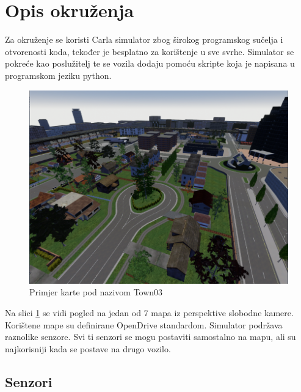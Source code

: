 \section{Opis okruženja}

Za okruženje se koristi Carla simulator zbog širokog programskog sučelja i otvorenosti koda, tekođer je besplatno za korištenje u sve svrhe. Simulator se pokreće kao poslužitelj te se vozila dodaju pomoću skripte koja je napisana u programskom jeziku python.

\begin{figure}[ht!]
  \centering
  \includegraphics[scale=0.5]{images/carla_town03_example.png}
  \caption{Primjer karte pod nazivom Town03}
  \label{fig:town03_exmaple}
\end{figure}

Na slici \ref{fig:town03_exmaple} se vidi pogled na jedan od 7 mapa iz perspektive slobodne kamere. Korištene mape su definirane OpenDrive standardom. Simulator podržava raznolike senzore. Svi ti senzori se mogu postaviti samostalno na mapu, ali su najkorisniji kada se postave na drugo vozilo.

\newpage
\subsection{Senzori}
